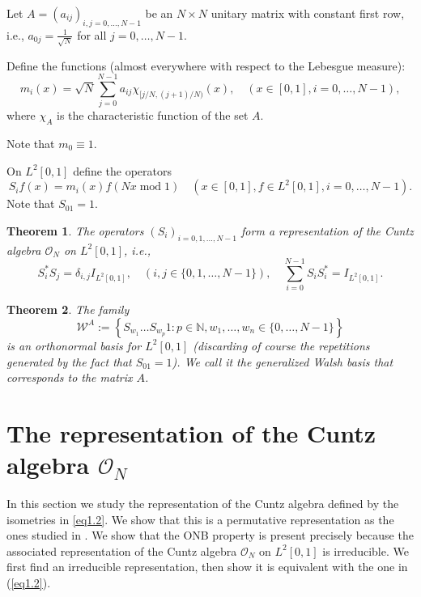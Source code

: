 \documentclass[11pt]{amsart}
\newtheorem{theorem}{Theorem}[section]
\theoremstyle{definition}
\theoremstyle{remark}
\numberwithin{equation}{section}
\newcommand{\bn}{\mathbb{N}}
\renewcommand{\mod}{\operatorname{mod}}
\begin{document}
Let $A=(a_{ij})_{i,j=0,\dots,N-1}$ be an $N\times N$ unitary matrix with constant first row, i.e., $a_{0j}=\frac{1}{\sqrt N}$ for all $j=0,\dots,N-1$.

Define the functions (almost everywhere with respect to the Lebesgue measure):
\begin{equation}
m_i(x)=\sqrt N\sum_{j=0}^{N-1}a_{ij}\chi_{[j/N,(j+1)/N)}(x),\quad(x\in [0,1],i=0,\dots,N-1),
\label{eq1.1}
\end{equation}
where $\chi_A$ is the characteristic function of the set $A$.


Note that $m_0\equiv 1$.


On $L^2[0,1]$ define the operators
\begin{equation}
S_if(x)=m_i(x)f(Nx\mod 1)\quad (x\in [0,1],f\in L^2[0,1], i=0,\dots,N-1).
\label{eq1.2}
\end{equation}
Note that $S_01=1$.

\begin{theorem}\label{thcuntz}\cite{DPS14}
The operators $(S_i)_{i=0,1,\dots,N-1}$ form a representation of the Cuntz algebra $\mathcal O_N$ on  $L^2[0,1]$, i.e.,
\begin{equation}
S_i^*S_j=\delta_{i,j}I_{L^2[0,1]},\quad(i,j\in\{0,1,\dots,N-1\}), \quad \sum_{i=0}^{N-1}S_iS_i^*=I_{L^2[0,1]}.
\label{eqcuntz}
\end{equation}

\end{theorem}

\begin{theorem}\label{thdps}\cite{DPS14}
The family
\begin{equation}
\mathcal W^A:=\left\{ S_{w_1}\dots S_{w_p}1 : p\in \bn, w_1,\dots, w_n\in\{0,\dots,N-1\}\right\}
\label{eq1.3}
\end{equation}
is an orthonormal basis for $L^2[0,1]$ (discarding of course the repetitions generated by the fact that $S_01=1$). We call it the generalized Walsh basis that corresponds to the matrix $A$.
\end{theorem}



\section{The representation of the Cuntz algebra $\mathcal O_N$}\label{s2}
In this section we study the representation of the Cuntz algebra defined by the isometries in \eqref{eq1.2}. We show that this is a permutative representation as the ones studied in \cite{MR1465320,DHJ15,MR1980913,MR2531317,MR2560855}.
We show that the ONB property is present precisely because the associated representation of the Cuntz algebra $\mathcal{O}_N$ on $L^2[0,1]$ is irreducible. We first find an irreducible representation, then show it is equivalent with the one in (\ref{eq1.2}).
\end{document}
